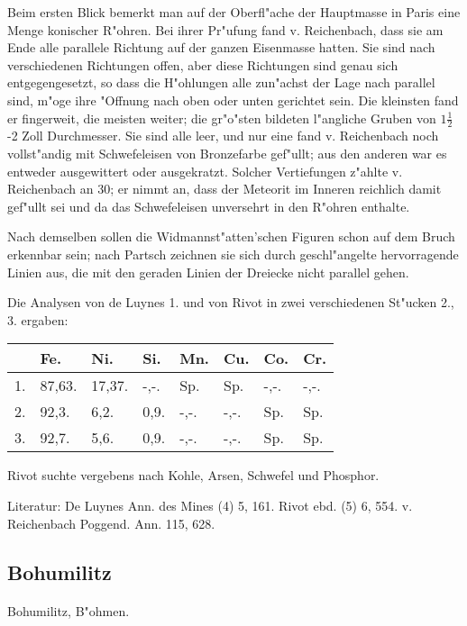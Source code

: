 \documentclass[a4paper, 11pt, oneside]{article}
\begin{document}
Beim ersten Blick bemerkt man auf der Oberfl"ache der Hauptmasse in Paris eine Menge konischer R"ohren. Bei ihrer Pr"ufung fand v. Reichenbach, dass sie am Ende alle parallele Richtung auf der ganzen Eisenmasse hatten. Sie sind nach verschiedenen Richtungen offen, aber diese Richtungen sind genau sich entgegengesetzt, so dass die H"ohlungen alle zun"achst der Lage nach parallel sind, m"oge ihre "Offnung nach oben oder unten gerichtet sein. Die kleinsten fand er fingerweit, die meisten weiter; die gr"o"sten bildeten l"angliche Gruben von $1\frac{1}{2}$-2 Zoll Durchmesser. Sie sind alle leer, und nur eine fand v. Reichenbach noch vollst"andig mit Schwefeleisen von Bronzefarbe gef"ullt; aus den anderen war es entweder ausgewittert oder ausgekratzt. Solcher Vertiefungen z"ahlte v. Reichenbach an 30; er nimmt an, dass der Meteorit im Inneren reichlich damit gef"ullt sei und da das Schwefeleisen unversehrt in den R"ohren enthalte.

Nach demselben sollen die Widmannst"atten'schen Figuren schon auf dem Bruch erkennbar sein; nach Partsch zeichnen sie sich durch geschl"angelte hervorragende Linien aus, die mit den geraden Linien der Dreiecke nicht parallel gehen.

Die Analysen von de Luynes 1. und von Rivot in zwei verschiedenen St"ucken 2., 3. ergaben:
\begin{table}[H]
    \centering
    \begin{tabular}{l l l l l l l l}
         & Fe. & Ni. & Si. & Mn. & Cu. & Co. & Cr. \\ \hline
        1. & 87,63. & 17,37. & -,-. & Sp. & Sp. & -,-. & -,-. \\
        2. & 92,3. & 6,2. & 0,9. & -,-. & -,-. & Sp. & Sp. \\
        3. & 92,7. & 5,6. & 0,9. & -,-. & -,-. & Sp. & Sp. \\
    \end{tabular}
\end{table}

Rivot suchte vergebens nach Kohle, Arsen, Schwefel und Phosphor.

\footnotesize
Literatur: De Luynes Ann. des Mines (4) 5, 161. Rivot ebd. (5) 6, 554. v. Reichenbach Poggend. Ann. 115, 628.

\subsection{Bohumilitz}
\normalsize
\paragraph{}
Bohumilitz, B"ohmen.
\end{document}
